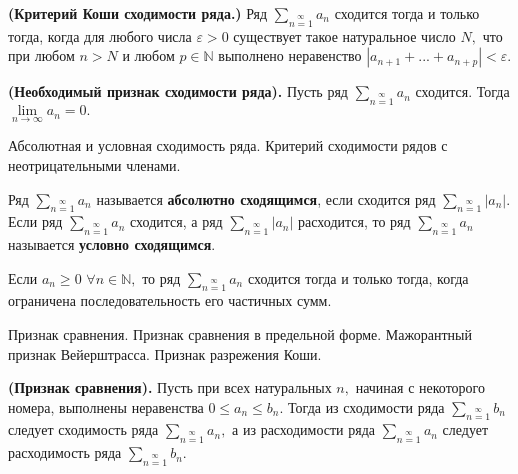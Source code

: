 \begin{theorem} \textbf{(Критерий Коши сходимости ряда.)}
	Ряд $\sum\limits_{n=1}\limits^{\infty}a_n$ сходится тогда
	и только тогда, когда для любого числа $\varepsilon>0$
	существует такое натуральное число $N,$ что
	при любом $n>N$ и любом $p\in\mathbb{N}$
	выполнено неравенство $|a_{n+1}+...+a_{n+p}|<\varepsilon.$
\end{theorem}

\begin{lemma}\textbf{(Необходимый признак сходимости ряда).}
	Пусть ряд $\sum\limits_{n=1}\limits^{\infty}a_n$
	сходится. Тогда $\lim\limits_{n\rightarrow\infty}
		a_n=0.$
\end{lemma}

\newpage
\begin{problem}
Абсолютная и условная сходимость ряда. Критерий сходимости рядов с неотрицательными членами.
\end{problem}

\begin{definition}
	Ряд $\sum\limits_{n=1}\limits^{\infty}a_n$
	называется \textbf{абсолютно сходящимся},
	если сходится ряд
	$\sum\limits_{n=1}\limits^{\infty}|a_n|.$
	Если ряд $\sum\limits_{n=1}\limits^{\infty}a_n$
	сходится, а ряд
	$\sum\limits_{n=1}\limits^{\infty}|a_n|$
	расходится, то ряд
	$\sum\limits_{n=1}\limits^{\infty}a_n$
	называется \textbf{условно сходящимся}.
\end{definition}

\begin{lemma}
	Если $a_n\geq0$ $\forall n\in\mathbb{N},$
	то ряд $\sum\limits_{n=1}\limits^{\infty}a_n$
	сходится тогда и только тогда,
	когда ограничена последовательность его
	частичных сумм.
\end{lemma}

\newpage
\begin{problem}
Признак сравнения. Признак сравнения в предельной форме. Мажорантный признак
Вейерштрасса. Признак разрежения Коши.
\end{problem}

\begin{theorem} \textbf{(Признак сравнения).}
	Пусть при всех натуральных $n,$
	начиная с некоторого номера,
	выполнены неравенства $0\leq a_n
		\leq b_n.$ Тогда из сходимости
	ряда $\sum\limits_{n=1}\limits^{\infty}b_n$
	следует сходимость ряда
	$\sum\limits_{n=1}\limits^{\infty}a_n,$
	а из расходимости ряда
	$\sum\limits_{n=1}\limits^{\infty}a_n$
	следует расходимость ряда
	$\sum\limits_{n=1}\limits^{\infty}b_n.$
\end{theorem}

